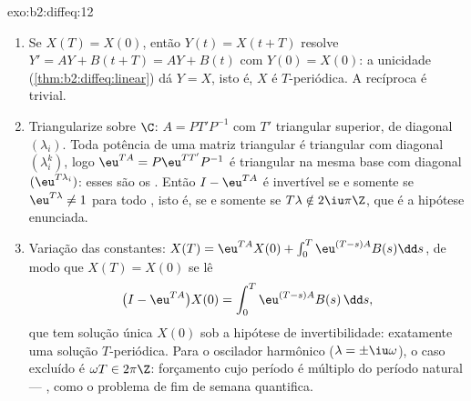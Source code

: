 \begin{solution}{exo:b2:diffeq:12}
\begin{enumerate}
  \item Se $X(T) = X(0)$, então $Y(t) = X(t + T)$ resolve $Y' =
        AY + B(t + T) = AY + B(t)$ com $Y(0) = X(0)$:
        a unicidade (\cref{thm:b2:diffeq:linear}) dá $Y = X$,
        isto é, $X$ é $T$-periódica. A recíproca é trivial.
  \item Triangularize sobre $\C$: $A = PT'P^{-1}$ com $T'$ triangular
        superior, de diagonal $(\lambda_i)$. Toda potência de uma
        matriz triangular é triangular com diagonal
        $(\lambda_i^k)$, logo $\eu^{TA} = P\eu^{TT'}P^{-1}$ é
        triangular na mesma base com diagonal
        $(\eu^{T\lambda_i})$: esses são os . Então
        $I - \eu^{TA}$ é invertível se e somente se $\eu^{T\lambda} \neq
        1$ para todo , isto é, se e somente se $T\lambda \notin
        2\iu\pi\Z$, que é a hipótese enunciada.
  \item Variação das constantes: $X(T) = \eu^{TA}X(0) +
        \int_0^T\eu^{(T-s)A}B(s)\dd s$, de modo que $X(T) = X(0)$ se lê
        \[
        \bigl(I - \eu^{TA}\bigr)X(0) =
        \int_0^{T}\eu^{(T-s)A}B(s)\,\dd s ,
        \]
        que tem solução única $X(0)$ sob a
        hipótese de invertibilidade: exatamente uma solução
        $T$-periódica. Para o oscilador harmônico ($\lambda =
        \pm\iu\omega$), o caso excluído é $\omega T \in
        2\pi\Z$: forçamento cujo período é múltiplo do
        período natural --- , como o problema de fim de semana
        quantifica.
\end{enumerate}
\end{solution}

